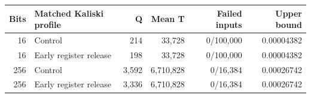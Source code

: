 \begin{tabular}{rlrrrr}
\toprule
Bits & Matched Kaliski profile & Q & Mean T & Failed inputs & Upper bound \\
\midrule
16 & Control & 214 & 33,728 & 0/100,000 & 0.00004382 \\
16 & Early register release & 198 & 33,728 & 0/100,000 & 0.00004382 \\
256 & Control & 3,592 & 6,710,828 & 0/16,384 & 0.00026742 \\
256 & Early register release & 3,336 & 6,710,828 & 0/16,384 & 0.00026742 \\
\bottomrule
\end{tabular}

